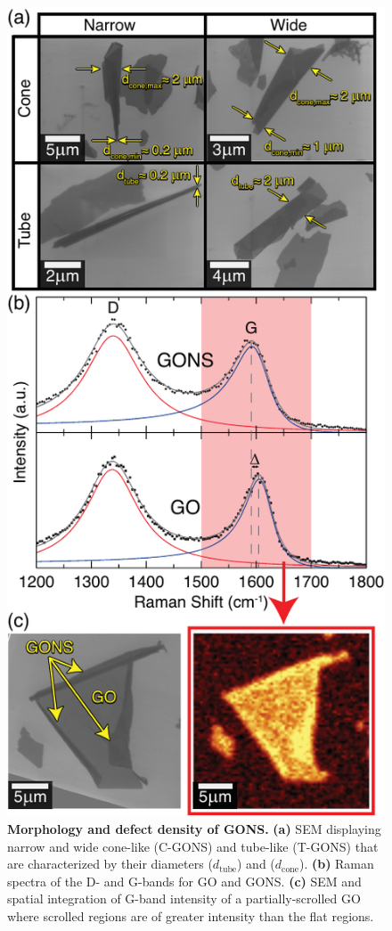 \begin{figure}[t!]
  \centering
  \includegraphics{paper1/Fig3.pdf}
  \caption{\textbf{Morphology and defect density of GONS.} \textbf{(a)} SEM displaying narrow and wide cone-like (C-GONS) and tube-like (T-GONS) that are characterized by their diameters ($d_{\mathrm{tube}}$) and ($d_{\mathrm{cone}}$). \textbf{(b)} Raman spectra of the D- and G-bands for GO and GONS. \textbf{(c)} SEM and spatial integration of G-band intensity of a partially-scrolled GO where scrolled regions are of greater intensity than the flat regions.}
  \label{fig3}
\end{figure}

